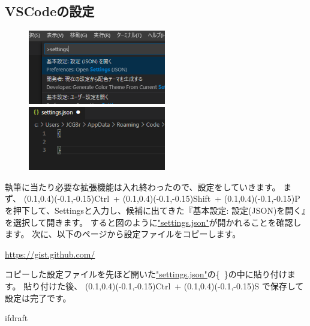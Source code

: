 		\subsection{VSCodeの設定}
			\begin{figure}
				\centering
				\includegraphics[width=60mm,trim=0 30 50 0,clip]{VSCode-setting-dialog.png}

				\vspace{2.5mm}
				
				\includegraphics[width=60mm]{VSCode-setting-json.png}
			\end{figure}
			執筆に当たり必要な拡張機能は入れ終わったので、設定をしていきます。
			まず、
			(0.1,0.4)(-0.1,-0.15)Ctrl~+
			(0.1,0.4)(-0.1,-0.15)Shift~+
			(0.1,0.4)(-0.1,-0.15)P
			を押下して、Settingsと入力し、候補に出てきた『基本設定: 設定(JSON)を開く』を選択して開きます。
			すると図のように\url{"settings.json"}が開かれることを確認します。
			次に、以下のページから設定ファイルをコピーします。
			\begin{mdframed}[style=shadow]
				\url{https://gist.github.com/}
			\end{mdframed}
			コピーした設定ファイルを先ほど開いた\url{"settings.json"}の\{~\}の中に貼り付けます。
			貼り付けた後、
			(0.1,0.4)(-0.1,-0.15)Ctrl~+
			(0.1,0.4)(-0.1,-0.15)S
			で保存して設定は完了です。

			\expandafter\ifx\csname ifdraft\endcsname\relax

\fi